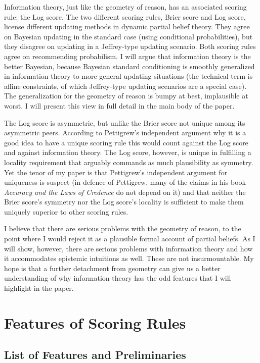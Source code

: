 \documentclass[12pt]{article}
\begin{document}
Information theory, just like the geometry of reason, has an
associated scoring rule: the Log score. The two different scoring
rules, Brier score and Log score, license different updating methods
in dynamic partial belief theory. They agree on Bayesian updating in
the standard case (using conditional probabilities), but they disagree
on updating in a Jeffrey-type updating scenario. Both scoring rules
agree on recommending probabilism. I will argue that information
theory is the better Bayesian, because Bayesian standard conditioning
is smoothly generalized in information theory to more general updating
situations (the technical term is affine constraints, of which
Jeffrey-type updating scenarios are a special case). The
generalization for the geometry of reason is bumpy at best,
implausible at worst. I will present this view in full detail in the
main body of the paper.

The Log score is asymmetric, but unlike the Brier score not unique
among its asymmetric peers. According to Pettigrew's independent
argument why it is a good idea to have a unique scoring rule this
would count against the Log score and against information theory. The
Log score, however, is unique in fulfilling a locality requirement
that arguably commands as much plausibility as symmetry. Yet the tenor
of my paper is that Pettigrew's independent argument for uniqueness is
suspect (in defence of Pettigrew, many of the claims in his book
\emph{Accuracy and the Laws of Credence} do not depend on it) and that
neither the Brier score's symmetry nor the Log score's locality is
sufficient to make them uniquely superior to other scoring rules.

I believe that there are serious problems with the geometry of reason,
to the point where I would reject it as a plausible formal account of
partial beliefs. As I will show, however, there are serious problems
with information theory and how it accommodates epistemic intuitions
as well. These are not insurmountable. My hope is that a further
detachment from geometry can give us a better understanding of why
information theory has the odd features that I will highlight in the
paper.

\section{Features of Scoring Rules}
\label{sec:vidiedoo}

\subsection{List of Features and Preliminaries}
\label{subsec:ayudoosa}
\end{document}
